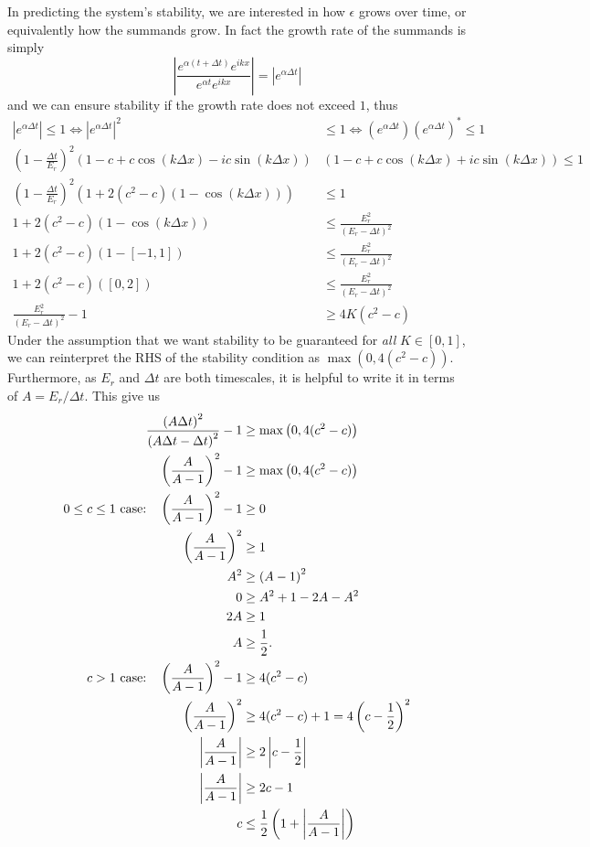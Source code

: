 \documentclass[11pt]{article}
\begin{document}
In predicting the system's stability, we are interested in how $\epsilon$ grows over time, or equivalently how the summands grow. In fact the growth rate of the summands is simply
\[
\left|\frac{e^{\alpha\left(t+\Delta t\right)}e^{ikx}}{e^{\alpha t}e^{ikx}}\right| = \left|e^{\alpha\Delta t}\right|
\]
and we can ensure stability if the growth rate does not exceed $1$, thus
\begin{align}
\left|e^{\alpha\Delta t}\right|\leq 1 \Leftrightarrow
\left|e^{\alpha\Delta t}\right|^2&\leq 1 \Leftrightarrow
\left(e^{\alpha\Delta t}\right)\left(e^{\alpha\Delta t}\right)^*\leq 1 \nonumber\\
\left(1-\frac{\Delta t}{E_r}\right)^2
\left(1-c+c\cos\left(k\Delta x\right)-ic\sin\left(k\Delta x\right)\right) &
\left(1-c+c\cos\left(k\Delta x\right)+ic\sin\left(k\Delta x\right)\right)\leq 1 \nonumber\\
\left(1-\frac{\Delta t}{E_r}\right)^2\left(1+2(c^2-c)(1-\cos(k\Delta x))\right) &\leq 1 \nonumber\\
1+2(c^2-c)(1-\cos(k\Delta x)) &\leq \frac{E_r^2}{\left(E_r-\Delta t\right)^2}	\tag{$\forall k$} \nonumber\\
1+2(c^2-c)(1-[-1,1]) &\leq \frac{E_r^2}{\left(E_r-\Delta t\right)^2} \nonumber\\
1+2(c^2-c)([0,2]) &\leq \frac{E_r^2}{\left(E_r-\Delta t\right)^2} \nonumber\\
\frac{E_r^2}{\left(E_r-\Delta t\right)^2}-1 &\geq 4K(c^2-c)			\label{eq:stable}
\end{align}
Under the assumption that we want stability to be guaranteed for \emph{all} $K\in[0,1]$, we can reinterpret the RHS of the stability condition as $\max\left(0,4(c^2-c)\right)$. Furthermore, as $E_r$ and $\Delta t$ are both timescales, it is helpful to write it in terms of $A=E_r/\Delta t$. This give us
\begin{align}
\frac{\left(A\Delta t\right)^2}{\left(A\Delta t-\Delta t\right)^2}-1 &\geq \max\left(0,4(c^2-c)\right) \nonumber\\
\left(\frac{A}{A-1}\right)^2 -1 &\geq \max\left(0,4(c^2-c)\right) \nonumber\\
\text{$0\leq c\leq 1$ case:\quad} \left(\frac{A}{A-1}\right)^2 -1 &\geq 0 \nonumber\\
\left(\frac{A}{A-1}\right)^2 &\geq 1 \nonumber\\
A^2 &\geq \left(A-1\right)^2 \nonumber\\
0 &\geq A^2 + 1 - 2A - A^2 \nonumber\\
2A &\geq 1 \nonumber\\
A &\geq \frac{1}{2}.		\label{eq:stab1} \\
\text{$c>1$ case:\quad} \left(\frac{A}{A-1}\right)^2 -1 &\geq 4(c^2-c)		\label{eq:stab4} \\
\left(\frac{A}{A-1}\right)^2 &\geq 4(c^2-c)+1 = 4\left(c-\frac{1}{2}\right)^2 \nonumber \\
\left|\frac{A}{A-1}\right| &\geq 2\left|c-\frac{1}{2}\right| \nonumber \\
\left|\frac{A}{A-1}\right| &\geq 2c-1 \nonumber \\
c &\leq \frac{1}{2}\left(1 + \left|\frac{A}{A-1}\right|\right) 	\label{eq:stab5}
\end{align}
\end{document}
